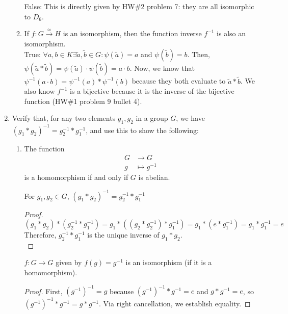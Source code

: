 \documentclass{amsart}
\begin{document}
\begin{enumerate}[itemsep=0.4in]
\begin{enumerate}[itemsep=0.2in]
    False: This is directly given by HW\#2 problem 7: they are all isomorphic to $D_6$.

    \item If $f:G\xrightarrow{\simeq}H$ is an isomorphism, then the function inverse $f^{-1}$ is also an isomorphism.\\

    True: $\forall a,b\in K\exists\tilde a,\tilde b\in G:\psi(\tilde a)=a$ and $\psi(\tilde b)=b$. Then, $\psi(\tilde a*\tilde b)=\psi(\tilde a)\cdot\psi(\tilde b)=a\cdot b$. Now, we know that $\psi^{-1}(a\cdot b)=\psi^{-1}(a)*\psi^{-1}(b)$ because they both evaluate to $\tilde a*\tilde b$. We also know $f^{-1}$ is a bijective because it is the inverse of the bijective function (HW\#1 problem 9 bullet 4).
\end{enumerate}


\item Verify that, for any two elements $g_1,g_2$ in a group $G$, we have $(g_1*g_2)^{-1} = g_2^{-1}*g_1^{-1}$, and use this to show the following: 

\begin{enumerate}
	\item The function
	\begin{align*}
	G&\to G\\
	g&\mapsto g^{-1}
	\end{align*}
	is a homomorphism if and only if $G$ is abelian.

        \begin{lemma}
            For $g_1,g_2\in G$, $(g_1*g_2)^{-1}=g_2^{-1}*g_1^{-1}$ 
        \end{lemma}

        \begin{proof}
            $$(g_1*g_2)*(g_2^{-1}*g_1^{-1})=g_1*((g_2*g_2^{-1})*g_1^{-1})=g_1*(e*g_1^{-1})=g_1*g_1^{-1}=e$$
            Therefore, $g_2^{-1}*g_1^{-1}$ is the unique inverse of $g_1*g_2$.\\
        \end{proof}

        \begin{lemma}
            $f:G\to G$ given by $f(g)=g^{-1}$ is an isomorphism (if it is a homomorphism).
        \end{lemma}

        \begin{proof}
            First, $(g^{-1})^{-1}=g$ because $(g^{-1})^{-1}*g^{-1}=e$ and $g*g^{-1}=e$, so $(g^{-1})^{-1}*g^{-1}=g*g^{-1}$. Via right cancellation, we establish equality.


\end{proof}
\end{enumerate}
\end{enumerate}
\end{document}
